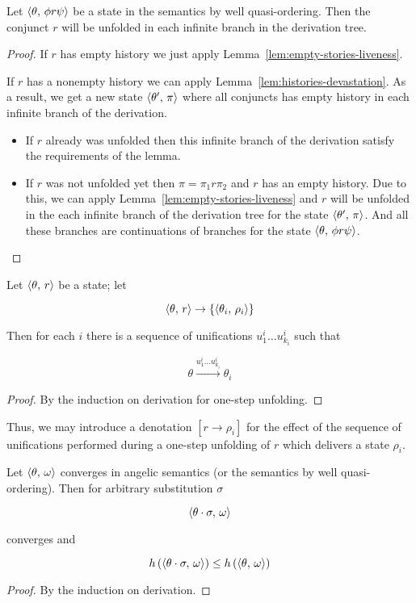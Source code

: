 \begin{lemma}
  \label{lem:liveness}
Let $\langle \theta,\, \phi r \psi \rangle$ be a state in the semantics by well quasi-ordering. Then the conjunct $r$ will be unfolded in each infinite branch in the derivation tree.
\end{lemma}
\begin{proof}
If $r$ has empty history we just apply Lemma~\ref{lem:empty-stories-liveness}.

If $r$ has a nonempty history we can apply Lemma~\ref{lem:histories-devastation}. As a result, we get a new state $\langle \theta^\prime,\, \pi \rangle$ where all conjuncts
has empty history in each infinite branch of the derivation.

\begin{itemize}
    \item If $r$ already was unfolded then this infinite branch of the derivation satisfy the requirements of the lemma.
    \item If $r$ was not unfolded yet then $\pi = \pi_1 r \pi_2$ and $r$ has an empty history. Due to this, we can apply 
    Lemma~\ref{lem:empty-stories-liveness} and $r$ will be unfolded in the each infinite branch of the derivation tree for the state $\langle \theta^\prime,\, \pi \rangle$.
    And all these branches are continuations of branches for the state $\langle \theta,\, \phi r \psi \rangle$.
\end{itemize}
\end{proof}

\begin{lemma}
\label{lem:one-step-unfolding}

Let $\langle \theta,\,r \rangle$ be a state; let

\[
\langle \theta,\,r \rangle\to\{\langle \theta_i,\,\rho_i \rangle\}
\]

Then for each $i$ there is a sequence of unifications $u^i_1\dots u^i_{k_i}$ such that

\[
\theta\xrightarrow{u^i_1\dots u^i_{k_i}}{\theta_i}
\]
\end{lemma}
\begin{proof}
By the induction on derivation for one-step unfolding.
\end{proof}

Thus, we may introduce a denotation $[r\to\rho_i]$ for the effect of the sequence of unifications performed during a one-step unfolding of $r$ which
delivers a state $\rho_i$. 

\begin{lemma}[Weakening]
  \label{lem:weakening}

  Let $\langle \theta,\,\omega \rangle$ converges in angelic semantics (or the semantics by well quasi-ordering). Then for arbitrary substitution $\sigma$ 

  \[
  \langle \theta\cdot\sigma,\,\omega \rangle
  \]

  converges and

  \[
  h\,(\langle \theta\cdot\sigma,\,\omega \rangle)\le h\,(\langle \theta,\,\omega \rangle)
  \]
  
\end{lemma}
\begin{proof}
  By the induction on derivation.
\end{proof}

